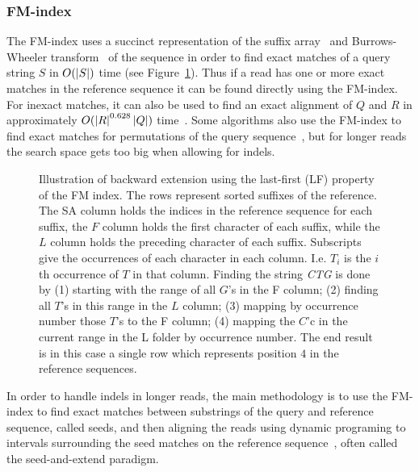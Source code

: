 \subsubsection{FM-index}
The FM-index uses a succinct representation of the suffix array~\cite{suffixarray} and Burrows-Wheeler transform~\cite{BWT} of the sequence in order to find exact matches of a query string $S$ in $O(\left|S\right|)$ time (see Figure~\ref{fig:FM}).
Thus if a read has one or more exact matches in the reference sequence it can be found directly using the FM-index.
For inexact matches, it can also be used to find an exact alignment of $Q$ and $R$ in approximately $O(\left|R\right|^{0.628}\left|Q\right|)$ time~\cite{bwtsw, bwalong}.
Some algorithms also use the FM-index to find exact matches for permutations of the query sequence~\cite{bowtie1, bwashort}, but for longer reads the search space gets too big when allowing for indels.
\begin{figure}
  \tikzpicture
  
  \endtikzpicture
  \caption{Illustration of backward extension using the last-first (LF) property of the FM index.
    The rows represent sorted suffixes of the reference. The SA column holds the indices in the reference sequence for each suffix, the $F$ column holds the first character of each suffix, while the $L$ column holds the preceding character of each suffix. Subscripts give the occurrences of each character in each column. I.e. $T_i$ is the $i$th occurrence of $T$ in that column. Finding the string \emph{CTG} is done by (1) starting with the range of all $G$'s in the F column; (2) finding all $T$'s in this range in the $L$ column; (3) mapping by occurrence number those $T$'s to the F column; (4) mapping the $C$'c in the current range in the L folder by occurrence number. The end result is in this case a single row which represents position $4$ in the reference sequences. 
  }
  \label{fig:FM}

\end{figure}

In order to handle indels in longer reads, the main methodology is to use the FM-index to find exact matches between substrings of the query and reference sequence, called seeds, and then aligning the reads using dynamic programing to intervals surrounding the seed matches on the reference sequence~\cite{bowtie2}, often called the seed-and-extend paradigm.

